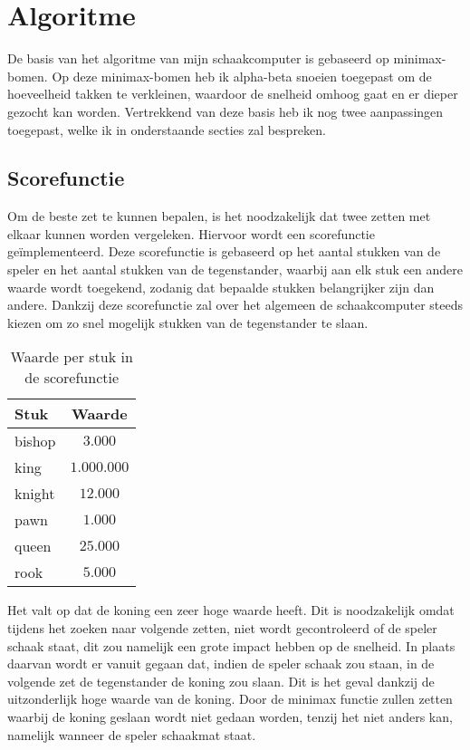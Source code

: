 \chapter{Algoritme}

De basis van het algoritme van mijn schaakcomputer is gebaseerd op minimax-bomen. Op deze minimax-bomen heb ik alpha-beta snoeien toegepast om de hoeveelheid takken te verkleinen, waardoor de snelheid omhoog gaat en er dieper gezocht kan worden. Vertrekkend van deze basis heb ik nog twee aanpassingen toegepast, welke ik in onderstaande secties zal bespreken.

\section{Scorefunctie}
Om de beste zet te kunnen bepalen, is het noodzakelijk dat twee zetten met elkaar kunnen worden vergeleken. Hiervoor wordt een scorefunctie ge\"implementeerd. Deze scorefunctie is gebaseerd op het aantal stukken van de speler en het aantal stukken van de tegenstander, waarbij aan elk stuk een andere waarde wordt toegekend, zodanig dat bepaalde stukken belangrijker zijn dan andere. Dankzij deze scorefunctie zal over het algemeen de schaakcomputer steeds kiezen om zo snel mogelijk stukken van de tegenstander te slaan.
\begin{table}[h]
	\centering
	\begin{tabular}{|l|c|}
		\hline
		\textbf{Stuk} & \textbf{Waarde}\\\hline
		bishop & $3.000$\\
		king & $1.000.000$\\
		knight & $12.000$\\
		pawn & $1.000$\\
		queen & $25.000$\\
		rook & $5.000$\\
		\hline
	\end{tabular}
	\caption{Waarde per stuk in de scorefunctie}
\end{table}

\noindent Het valt op dat de koning een zeer hoge waarde heeft. Dit is noodzakelijk omdat tijdens het zoeken naar volgende zetten, niet wordt gecontroleerd of de speler schaak staat, dit zou namelijk een grote impact hebben op de snelheid. In plaats daarvan wordt er vanuit gegaan dat, indien de speler schaak zou staan, in de volgende zet de tegenstander de koning zou slaan. Dit is het geval dankzij de uitzonderlijk hoge waarde van de koning. Door de minimax functie zullen zetten waarbij de koning geslaan wordt niet gedaan worden, tenzij het niet anders kan, namelijk wanneer de speler schaakmat staat.

